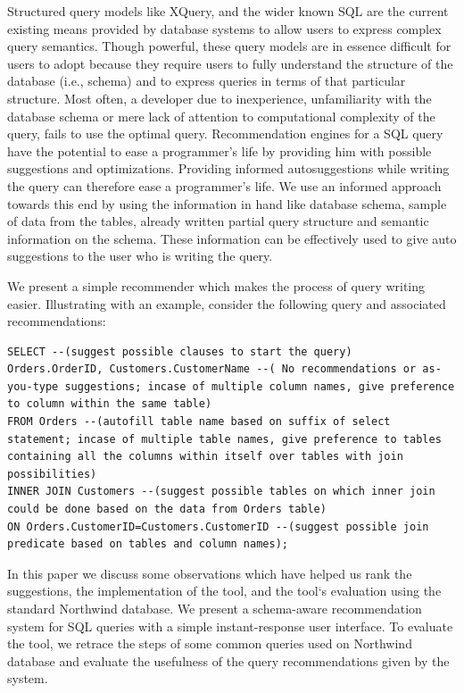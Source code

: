 \documentclass{acm_proc_article-sp}
\begin{document}
Structured query models like XQuery, and the wider known SQL are the current existing means provided by database systems to allow users to express complex query semantics. Though powerful, these query models are in essence difficult for users to adopt because they require users to fully understand the structure of the database (i.e., schema) and to express queries in terms of that particular structure. Most often, a developer due to inexperience, unfamiliarity with the database schema or mere lack of attention to computational complexity of the query, fails to use the optimal query. Recommendation engines for a SQL query have the potential to ease a programmer's life by providing him with possible suggestions and optimizations. Providing informed autosuggestions while writing the query can therefore ease a programmer's life.  We use an informed approach towards this end by using the information in hand like database schema, sample of data from the tables, already written partial query structure and semantic information on the schema. These information can be effectively used to give auto suggestions to the user who is writing the query. 

We present a simple recommender which makes the process of query writing easier.  Illustrating with an example, consider the following query and associated recommendations:

\lstset{language=SQL,breaklines=true}
\begin{lstlisting}[float=*]
SELECT --(suggest possible clauses to start the query)
Orders.OrderID, Customers.CustomerName --( No recommendations or as-you-type suggestions; incase of multiple column names, give preference to column within the same table) 
FROM Orders --(autofill table name based on suffix of select statement; incase of multiple table names, give preference to tables containing all the columns within itself over tables with join possibilities) 
INNER JOIN Customers --(suggest possible tables on which inner join could be done based on the data from Orders table) 
ON Orders.CustomerID=Customers.CustomerID --(suggest possible join predicate based on tables and column names); 
\end{lstlisting}

In this paper we discuss some observations which have helped us rank the suggestions, the implementation of the tool, and the tool`s evaluation using the standard Northwind database. We present a schema-aware recommendation system for SQL queries with a simple instant-response user interface. To evaluate the tool, we retrace the steps of some common queries used on Northwind database and evaluate the usefulness of the query recommendations given by the system.  
\end{document}
